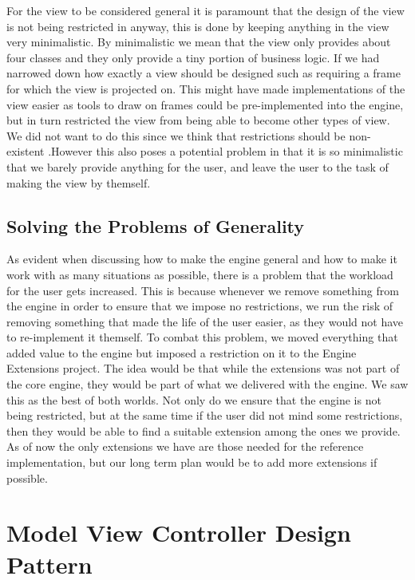 For the view to be considered general it is paramount that the design
of the view is not being restricted in anyway, this is done by keeping
anything in the view very minimalistic. By minimalistic we mean that
the view only provides about four classes and they only provide a
tiny portion of business logic. If we had narrowed down how exactly
a view should be designed such as requiring a frame for which the
view is projected on. This might have made implementations of the
view easier as tools to draw on frames could be pre-implemented into
the engine, but in turn restricted the view from being able to become
other types of view. We did not want to do this since we think that
restrictions should be non-existent .However this also poses a potential
problem in that it is so minimalistic that we barely provide anything
for the user, and leave the user to the task of making the view by
themself.


\subsection*{Solving the Problems of Generality}

As evident when discussing how to make the engine general and how
to make it work with as many situations as possible, there is a problem
that the workload for the user gets increased. This is because whenever
we remove something from the engine in order to ensure that we impose
no restrictions, we run the risk of removing something that made the
life of the user easier, as they would not have to re-implement it
themself. To combat this problem, we moved everything that added value
to the engine but imposed a restriction on it to the Engine Extensions
project. The idea would be that while the extensions was not part
of the core engine, they would be part of what we delivered with the
engine. We saw this as the best of both worlds. Not only do we ensure
that the engine is not being restricted, but at the same time if the
user did not mind some restrictions, then they would be able to find
a suitable extension among the ones we provide. As of now the only
extensions we have are those needed for the reference implementation,
but our long term plan would be to add more extensions if possible.


\section{Model View Controller Design Pattern}

